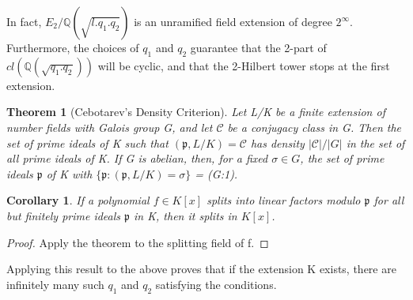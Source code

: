 \documentclass[preprint,12pt,reqno]{elsarticle}
\newtheorem{theorem}{Theorem}
\newtheorem{corollary}{Corollary}[theorem]
\begin{document}
\begin{center}
\end{center}
In fact, $E_2/\mathbb{Q}(\sqrt{l.q_1.q_2})$ is an unramified field extension of degree $2^{\infty}$. Furthermore, the choices of $q_1$ and $q_2$ guarantee that the 2-part of $cl(\mathbb{Q}(\sqrt{q_1.q_2}))$ will be cyclic, and that the 2-Hilbert tower stops at the first extension. 
\begin{theorem}[Cebotarev's Density Criterion]
Let L/K be a finite extension of
number fields with Galois group G, and let $\mathcal{C}$ be a conjugacy class in G. Then the set of
prime ideals of K such that $(\mathfrak{p},L/K)=\mathcal{C}$ has density $|\mathcal{C}|/|G|$ in the set of all prime
ideals of K. If G is abelian, then, for a fixed $\sigma\in G$, the set of prime ideals $\mathfrak{p}$ of K with $\{\mathfrak{p}:(\mathfrak{p},L/K)=\sigma\}$  = (G:1).
\end{theorem}
\begin{corollary}
 If a polynomial $f \in K[x]$ splits into linear factors modulo $\mathfrak{p}$ for all but finitely prime ideals $\mathfrak{p}$ in K, then it splits in $K[x]$.
\end{corollary}
\begin{proof}
Apply the theorem to the splitting field of f.
\end{proof}
Applying this result to the above proves that if the extension K exists, there are infinitely many such $q_1$ and $q_2$ satisfying the conditions.
\end{document}
